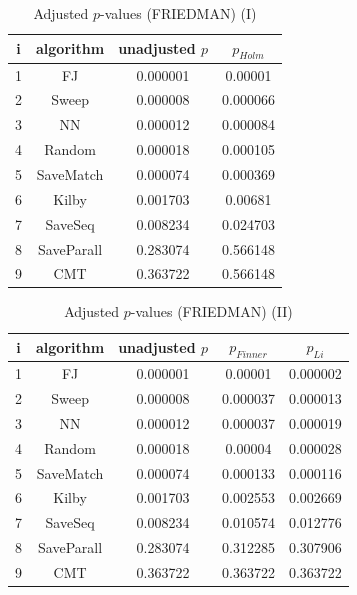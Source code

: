 \documentclass[a4paper,10pt]{article}
\begin{document}
\begin{landscape}
\begin{table}[!htp]
\centering\small
\begin{tabular}{cccc}
i&algorithm&unadjusted $p$&$p_{Holm}$\\
\hline1&FJ&0.000001&0.00001\\2&Sweep&0.000008&0.000066\\3&NN&0.000012&0.000084\\4&Random&0.000018&0.000105\\5&SaveMatch&0.000074&0.000369\\6&Kilby&0.001703&0.00681\\7&SaveSeq&0.008234&0.024703\\8&SaveParall&0.283074&0.566148\\9&CMT&0.363722&0.566148\\\hline
\end{tabular}
\caption{Adjusted $p$-values (FRIEDMAN) (I)}
\end{table}
\begin{table}[!htp]
\centering\small
\begin{tabular}{ccccc}
i&algorithm&unadjusted $p$&$p_{Finner}$&$p_{Li}$\\
\hline1&FJ&0.000001&0.00001&0.000002\\2&Sweep&0.000008&0.000037&0.000013\\3&NN&0.000012&0.000037&0.000019\\4&Random&0.000018&0.00004&0.000028\\5&SaveMatch&0.000074&0.000133&0.000116\\6&Kilby&0.001703&0.002553&0.002669\\7&SaveSeq&0.008234&0.010574&0.012776\\8&SaveParall&0.283074&0.312285&0.307906\\9&CMT&0.363722&0.363722&0.363722\\\hline
\end{tabular}
\caption{Adjusted $p$-values (FRIEDMAN) (II)}
\end{table}

\newpage
\end{landscape}
\end{document}
